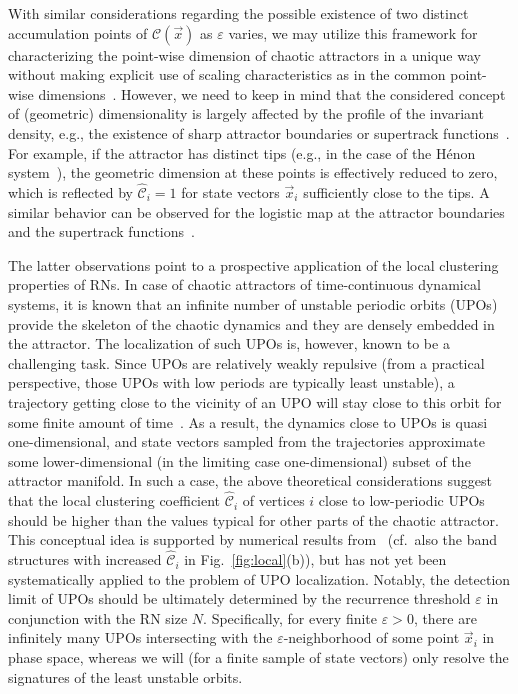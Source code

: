 		With similar considerations regarding the possible existence of two distinct accumulation points of $\mathcal{C}(\vec{x})$ as $\varepsilon$ varies, we may utilize this framework for characterizing the point-wise dimension of chaotic attractors in a unique way without making explicit use of scaling characteristics as in the common point-wise dimensions~\cite{Donner2011b}. However, we need to keep in mind that the considered concept of (geometric) dimensionality is largely affected by the profile of the invariant density, e.g., the existence of sharp attractor boundaries or supertrack functions~\cite{Donner2010Nolta,Donner2011b,Donner2010a}. For example, if the attractor has distinct tips (e.g., in the case of the H\'enon system~\cite{Donner2011b,Donner2010a}), the geometric dimension at these points is effectively reduced to zero, which is reflected by $\hat{\mathcal{C}}_i=1$ for state vectors $\vec{x}_i$ sufficiently close to the tips. A similar behavior can be observed for the logistic map at the attractor boundaries and the supertrack functions~\cite{Donner2010Nolta,Donner2011b,Donner2010a}.

		The latter observations point to a prospective application of the local clustering properties of RNs. In case of chaotic attractors of time-continuous dynamical systems, it is known that an infinite number of unstable periodic orbits (UPOs) provide the skeleton of the chaotic dynamics and they are densely embedded in the attractor. The localization of such UPOs is, however, known to be a challenging task. Since UPOs are relatively weakly repulsive (from a practical perspective, those UPOs with low periods are typically least unstable), a trajectory getting close to the vicinity of an UPO will stay close to this orbit for some finite amount of time~\cite{Lathrop1989}. As a result, the dynamics close to UPOs is quasi one-dimensional, and state vectors sampled from the trajectories approximate some lower-dimensional (in the limiting case one-dimensional) subset of the attractor manifold. In such a case, the above theoretical considerations suggest that the local clustering coefficient $\hat{\mathcal{C}}_i$ of vertices $i$ close to low-periodic UPOs should be higher than the values typical for other parts of the chaotic attractor. This conceptual idea is supported by numerical results from~\cite{Donner2010b,Donner2010a} (cf.\, also the band structures with increased $\hat{\mathcal{C}}_i$ in Fig.~\ref{fig:local}(b)), but has not yet been systematically applied to the problem of UPO localization. Notably, the detection limit of UPOs should be ultimately determined by the recurrence threshold $\varepsilon$ in conjunction with the RN size $N$. Specifically, for every finite $\varepsilon>0$, there are infinitely many UPOs intersecting with the $\varepsilon$-neighborhood of some point $\vec{x}_i$ in phase space, whereas we will (for a finite sample of state vectors) only resolve the signatures of the least unstable orbits.


